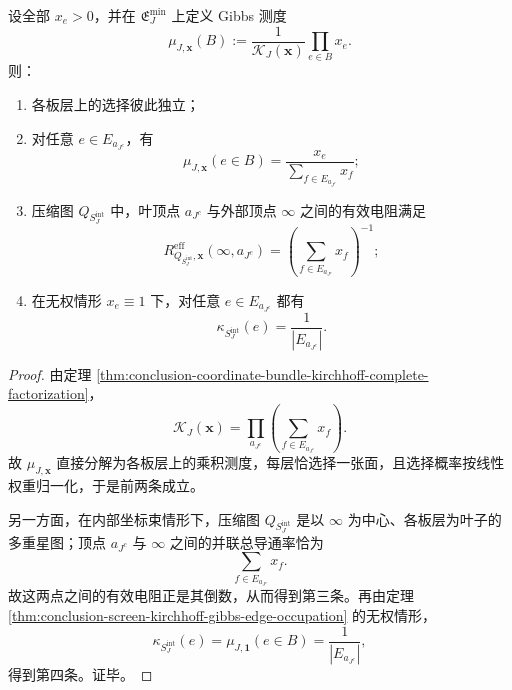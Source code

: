 \begin{corollary}\label{cor:conclusion-coordinate-bundle-gibbs-resistance-closed-form}
设全部 \(x_e>0\)，并在 \(\mathfrak E_J^{\min}\) 上定义 Gibbs 测度
\[
\mu_{J,\mathbf x}(B)
:=
\frac{1}{\mathcal K_J(\mathbf x)}
\prod_{e\in B}x_e.
\]
则：
\begin{enumerate}
  \item 各板层上的选择彼此独立；
  \item 对任意 \(e\in E_{a_{J^c}}\)，有
  \[
  \mu_{J,\mathbf x}(e\in B)
  =
  \frac{x_e}{\sum_{f\in E_{a_{J^c}}}x_f};
  \]
  \item 压缩图 \(Q_{S_J^{\mathrm{int}}}\) 中，叶顶点 \(a_{J^c}\) 与外部顶点 \(\infty\) 之间的有效电阻满足
  \[
  R^{\mathrm{eff}}_{Q_{S_J^{\mathrm{int}}},\mathbf x}(\infty,a_{J^c})
  =
  \left(
  \sum_{f\in E_{a_{J^c}}}x_f
  \right)^{-1};
  \]
  \item 在无权情形 \(x_e\equiv 1\) 下，对任意 \(e\in E_{a_{J^c}}\) 都有
  \[
  \kappa_{S_J^{\mathrm{int}}}(e)=\frac{1}{|E_{a_{J^c}}|}.
  \]
\end{enumerate}
\end{corollary}
\begin{proof}
由定理 \ref{thm:conclusion-coordinate-bundle-kirchhoff-complete-factorization}，
\[
\mathcal K_J(\mathbf x)
=
\prod_{a_{J^c}}
\left(
\sum_{f\in E_{a_{J^c}}}x_f
\right).
\]
故 \(\mu_{J,\mathbf x}\) 直接分解为各板层上的乘积测度，每层恰选择一张面，且选择概率按线性权重归一化，于是前两条成立。

另一方面，在内部坐标束情形下，压缩图 \(Q_{S_J^{\mathrm{int}}}\) 是以 \(\infty\) 为中心、各板层为叶子的多重星图；顶点 \(a_{J^c}\) 与 \(\infty\) 之间的并联总导通率恰为
\[
\sum_{f\in E_{a_{J^c}}}x_f.
\]
故这两点之间的有效电阻正是其倒数，从而得到第三条。再由定理 \ref{thm:conclusion-screen-kirchhoff-gibbs-edge-occupation} 的无权情形，
\[
\kappa_{S_J^{\mathrm{int}}}(e)
=
\mu_{J,\mathbf 1}(e\in B)
=
\frac{1}{|E_{a_{J^c}}|},
\]
得到第四条。证毕。
\end{proof}

